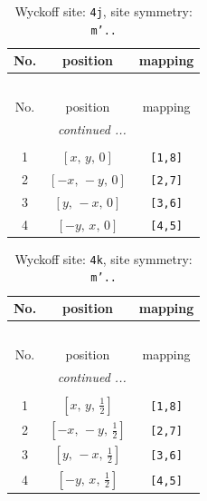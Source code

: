 \documentclass[fleqn,8pt]{jsarticle}
\begin{document}
\begin{longtable}{ccc}
\caption{Wyckoff site: {\tt 4j}, site symmetry: {\tt m'..}}
 \\
 \hline \hline
No. & position & mapping \\ \hline \endfirsthead

\multicolumn{2}{l}{\tablename\ \thetable{}} \\
 \hline \hline
No. & position & mapping \\ \hline \endhead

 \hline \hline
\multicolumn{2}{r}{\footnotesize\it continued ...} \\ \endfoot

 \hline \hline
\multicolumn{2}{r}{} \\ \endlastfoot

1 & $\left[ x,\, y,\, 0 \right]$ & {\tt [1,8]} \\ \hline
2 & $\left[ - x,\, - y,\, 0 \right]$ & {\tt [2,7]} \\ \hline
3 & $\left[ y,\, - x,\, 0 \right]$ & {\tt [3,6]} \\ \hline
4 & $\left[ - y,\, x,\, 0 \right]$ & {\tt [4,5]} \\
\end{longtable}
\renewcommand{\arraystretch}{1.2}
\begin{longtable}{ccc}
\caption{Wyckoff site: {\tt 4k}, site symmetry: {\tt m'..}}
 \\
 \hline \hline
No. & position & mapping \\ \hline \endfirsthead

\multicolumn{2}{l}{\tablename\ \thetable{}} \\
 \hline \hline
No. & position & mapping \\ \hline \endhead

 \hline \hline
\multicolumn{2}{r}{\footnotesize\it continued ...} \\ \endfoot

 \hline \hline
\multicolumn{2}{r}{} \\ \endlastfoot

1 & $\left[ x,\, y,\, \frac{1}{2} \right]$ & {\tt [1,8]} \\ \hline
2 & $\left[ - x,\, - y,\, \frac{1}{2} \right]$ & {\tt [2,7]} \\ \hline
3 & $\left[ y,\, - x,\, \frac{1}{2} \right]$ & {\tt [3,6]} \\ \hline
4 & $\left[ - y,\, x,\, \frac{1}{2} \right]$ & {\tt [4,5]} \\
\end{longtable}
\end{document}
